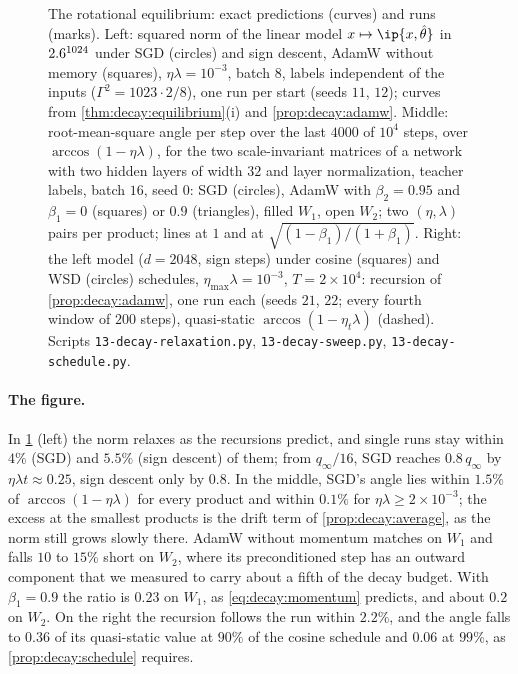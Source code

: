 \begin{refsection}
\begin{figure}[t]
\caption{The rotational equilibrium: exact predictions (curves) and runs (marks). Left: squared norm of the linear model $x\mapsto\ip{x,\hat\theta}$ in $2.6^{1024}$ under SGD (circles) and sign descent, AdamW without memory (squares), $\eta\lambda=10^{-3}$, batch $8$, labels independent of the inputs ($\Gamma^2=1023\cdot2/8$), one run per start (seeds $11$, $12$); curves from \cref{thm:decay:equilibrium}(i) and \cref{prop:decay:adamw}. Middle: root-mean-square angle per step over the last $4000$ of $10^4$ steps, over $\arccos(1-\eta\lambda)$, for the two scale-invariant matrices of a network with two hidden layers of width $32$ and layer normalization, teacher labels, batch $16$, seed $0$: SGD (circles), AdamW with $\beta_2=0.95$ and $\beta_1=0$ (squares) or $0.9$ (triangles), filled $W_1$, open $W_2$; two $(\eta,\lambda)$ pairs per product; lines at $1$ and at $\sqrt{(1-\beta_1)/(1+\beta_1)}$. Right: the left model ($d=2048$, sign steps) under cosine (squares) and WSD (circles) schedules, $\eta_{\max}\lambda=10^{-3}$, $T=2\times10^4$: recursion of \cref{prop:decay:adamw}, one run each (seeds $21$, $22$; every fourth window of $200$ steps), quasi-static $\arccos(1-\eta_t\lambda)$ (dashed). Scripts \texttt{13-decay-relaxation.py}, \texttt{13-decay-sweep.py}, \texttt{13-decay-schedule.py}.}
\label{fig:decay:equilibrium}
\end{figure}

\paragraph{The figure.} In \cref{fig:decay:equilibrium} (left) the norm relaxes as the recursions predict, and single runs stay within $4\%$ (SGD) and $5.5\%$ (sign descent) of them; from $q_\infty/16$, SGD reaches $0.8\,q_\infty$ by $\eta\lambda t\approx0.25$, sign descent only by $0.8$. In the middle, SGD's angle lies within $1.5\%$ of $\arccos(1-\eta\lambda)$ for every product and within $0.1\%$ for $\eta\lambda\ge2\times10^{-3}$; the excess at the smallest products is the drift term of \cref{prop:decay:average}, as the norm still grows slowly there. AdamW without momentum matches on $W_1$ and falls $10$ to $15\%$ short on $W_2$, where its preconditioned step has an outward component that we measured to carry about a fifth of the decay budget. With $\beta_1=0.9$ the ratio is $0.23$ on $W_1$, as \eqref{eq:decay:momentum} predicts, and about $0.2$ on $W_2$. On the right the recursion follows the run within $2.2\%$, and the angle falls to $0.36$ of its quasi-static value at $90\%$ of the cosine schedule and $0.06$ at $99\%$, as \cref{prop:decay:schedule} requires.


\end{refsection}
